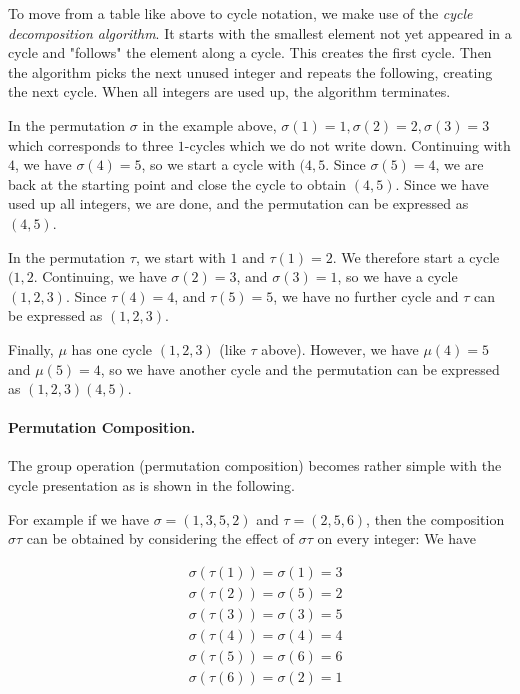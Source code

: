 To move from a table like above to cycle notation, we make use of the \emph{cycle decomposition algorithm}. It starts with the smallest element not yet appeared in a cycle and "follows" the element along a cycle. This creates the first cycle. Then the algorithm picks the next unused integer and repeats the following, creating the next cycle. When all integers are used up, the algorithm terminates.

In the permutation $\sigma$ in the example above, $\sigma(1) = 1, \sigma(2) = 2, \sigma(3) = 3$ which corresponds to three  $1$-cycles which we do not write down. Continuing with $4$, we have $\sigma(4) = 5$, so we start a cycle with $(4, 5$. Since $\sigma(5) = 4$, we are back at the starting point and close the cycle to obtain $(4,5)$. Since we have used up all integers, we are done, and the permutation can be expressed as $(4,5)$.

In the permutation $\tau$, we start with $1$ and $\tau(1) = 2$. We therefore start a cycle $(1,2$. Continuing, we have $\sigma(2) = 3$, and $\sigma(3) = 1$, so we have a cycle $(1,2,3)$. Since $\tau(4) = 4$, and $\tau(5) = 5$, we have no further cycle and $\tau$ can be expressed as $(1,2,3)$.

Finally, $\mu$ has one cycle $(1,2,3)$ (like $\tau$ above). However, we have $\mu(4) = 5$ and $\mu(5) = 4$, so we have another cycle and the permutation can be expressed as  $(1,2,3)(4,5)$.

\paragraph{Permutation Composition.} The group operation (permutation composition) becomes rather simple with the cycle presentation as is shown in the following. 

For example if we have $\sigma=(1,3,5,2)$ and $\tau = (2,5,6)$, then the composition $\sigma \tau$ can be obtained by considering the effect of $\sigma \tau$ on every integer: We have

\begin{align*}
  &\sigma (\tau (1)) = \sigma(1) = 3 \\
  &\sigma (\tau (2)) = \sigma(5) = 2 \\
  &\sigma (\tau (3)) = \sigma(3) = 5 \\
  &\sigma (\tau (4)) = \sigma(4) = 4 \\
  &\sigma (\tau (5)) = \sigma(6) = 6 \\
  &\sigma (\tau (6)) = \sigma(2) = 1
\end{align*}

